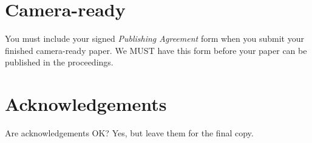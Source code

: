 \section{Camera-ready}

You must include your signed \textit{Publishing Agreement} form when you submit your finished camera-ready paper.
We MUST have this form before your paper can be published in the proceedings.

\section*{Acknowledgements}

Are acknowledgements OK?
Yes, but leave them for the final copy.
